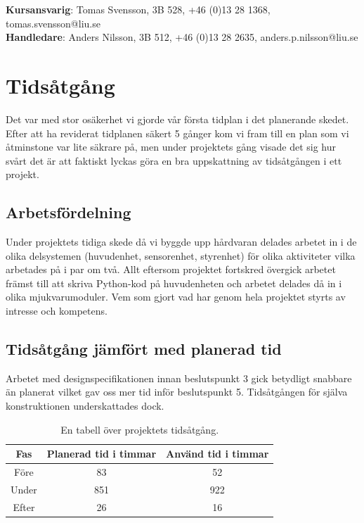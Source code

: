 \documentclass{article}
\begin{document}
\begin{center}
\textbf{Kursansvarig}: Tomas Svensson, 3B 528, +46 (0)13 28 1368, tomas.svensson@liu.se \\
\textbf{Handledare}: Anders Nilsson, 3B 512, +46 (0)13 28 2635, anders.p.nilsson@liu.se
\end{center}
\vspace*{\fill}
\clearpage

\renewcommand*\contentsname{Innehållsförteckning}
\tableofcontents

\clearpage
\section{Tidsåtgång}
Det var med stor osäkerhet vi gjorde vår första tidplan i det planerande skedet. Efter att ha reviderat tidplanen säkert 5 gånger kom vi fram till en plan som vi åtminstone var lite säkrare på, men under projektets gång visade det sig hur svårt det är att faktiskt lyckas göra en bra uppskattning av tidsåtgången i ett projekt.

\subsection{Arbetsfördelning}
Under projektets tidiga skede då vi byggde upp hårdvaran delades arbetet in i de olika delsystemen (huvudenhet, sensorenhet, styrenhet) för olika aktiviteter vilka arbetades på i par om två. Allt eftersom projektet fortskred övergick arbetet främst till att skriva Python-kod på huvudenheten och arbetet delades då in i olika mjukvarumoduler. Vem som gjort vad har genom hela projektet styrts av intresse och kompetens.

\subsection{Tidsåtgång jämfört med planerad tid}
Arbetet med designspecifikationen innan beslutspunkt 3 gick betydligt snabbare än planerat vilket gav oss mer tid inför beslutspunkt 5. Tidsåtgången för själva konstruktionen underskattades dock.

\begin{table}[H]
\centering
\caption{En tabell över projektets tidsåtgång.}
\begin{tabular}{ | c | c | c | }
\hline
Fas & Planerad tid i timmar & Använd tid i timmar \\
\hline
Före & 83 & 52 \\
\hline
Under & 851 & 922 \\
\hline
Efter & 26 & 16 \\
\hline
\end{tabular}
\label{table:tidsatgang}
\end{table}
\ \\
\end{document}
